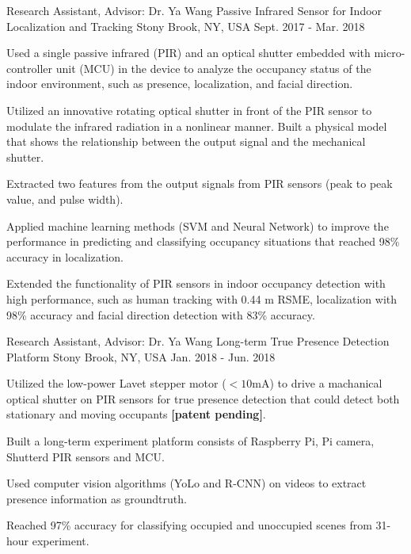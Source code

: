 \begin{cventries}
\cventry
{Research Assistant, Advisor: Dr. Ya Wang} %
{Passive Infrared Sensor for Indoor Localization and Tracking} %
{Stony Brook, NY, USA} %
{Sept. 2017 - Mar. 2018} %
{
  \begin{cvitems} %
    \item Used a single passive infrared (PIR) and an optical shutter embedded with micro-controller unit (MCU) in the device to analyze the occupancy status of the indoor environment, such as presence, localization, and facial direction. 
    \item Utilized an innovative rotating optical shutter in front of the PIR sensor to modulate the infrared radiation in a nonlinear manner. Built a physical model that shows the relationship between the output signal and the mechanical shutter.
    \item Extracted two features from the output signals from PIR sensors (peak to peak value, and pulse width). 
    \item Applied machine learning methods (SVM and Neural Network) to improve the performance in predicting and classifying occupancy situations that reached 98\% accuracy in localization.  
    \item Extended the functionality of PIR sensors in indoor occupancy detection with high performance, such as human tracking with 0.44 m RSME, localization with 98\% accuracy and facial direction detection with 83\% accuracy. 
  \end{cvitems}
}

  \cventry
    {Research Assistant, Advisor: Dr. Ya Wang} %
    {Long-term True Presence Detection Platform} %
    {Stony Brook, NY, USA} %
    {Jan. 2018 - Jun. 2018} %
    {
      \begin{cvitems} %
        \item Utilized the low-power Lavet stepper motor ($<10$mA) to drive a machanical optical shutter on PIR sensors for true presence detection that could detect both stationary and moving occupants \textbf{[patent pending]}.
        \item Built a long-term experiment platform consists of Raspberry Pi, Pi camera, Shutterd PIR sensors and MCU.
        \item Used computer vision algorithms (YoLo and R-CNN) on videos to extract presence information as groundtruth.
        \item Reached 97\% accuracy for classifying occupied and unoccupied scenes from 31-hour experiment.
      \end{cvitems}
    }


\end{cventries}
